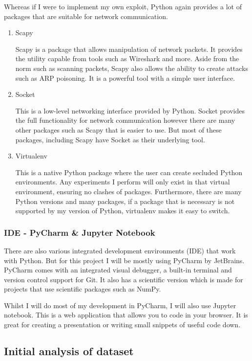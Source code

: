 \documentclass[11pt]{article}
\begin{document}
Whereas if I were to implement my own exploit, Python again provides a lot of packages that are suitable for network communication. 

\begin{enumerate}
  \item{Scapy}

  Scapy is a package that allows manipulation of network packets. It provides the utility capable from tools such as Wireshark \cite{bg-work-pentesting-lib} and more. Aside from the norm such as scanning packets, Scapy also allows the ability to create attacks such as ARP poisoning. It is a powerful tool with a simple user interface.

  \item{Socket}
  
  This is a low-level networking interface provided by Python. Socket provides the full functionality for network communication however there are many other packages such as Scapy that is easier to use. But most of these packages, including Scapy have Socket as their underlying tool.

  \item{Virtualenv}

  This is a native Python package where the user can create secluded Python environments. Any experiments I perform will only exist in that virtual environment, ensuring no clashes of packages. Furthermore, there are many Python versions and many packages, if a package that is necessary is not supported by my version of Python, virtualenv makes it easy to switch.  
\end{enumerate}

\subsubsection{IDE - PyCharm \& Jupyter Notebook}
There are also various integrated development environments (IDE) that work with Python. But for this project I will be mostly using PyCharm by JetBrains. PyCharm comes with an integrated visual debugger, a built-in terminal and version control support for Git. It also has a scientific version which is made for projects that use scientific packages such as NumPy.

Whilst I will do most of my development in PyCharm, I will also use Jupyter notebook. This is a web application that allows you to code in your browser. It is great for creating a presentation or writing small snippets of useful code down. 

\subsection{Initial analysis of dataset}
\end{document}
